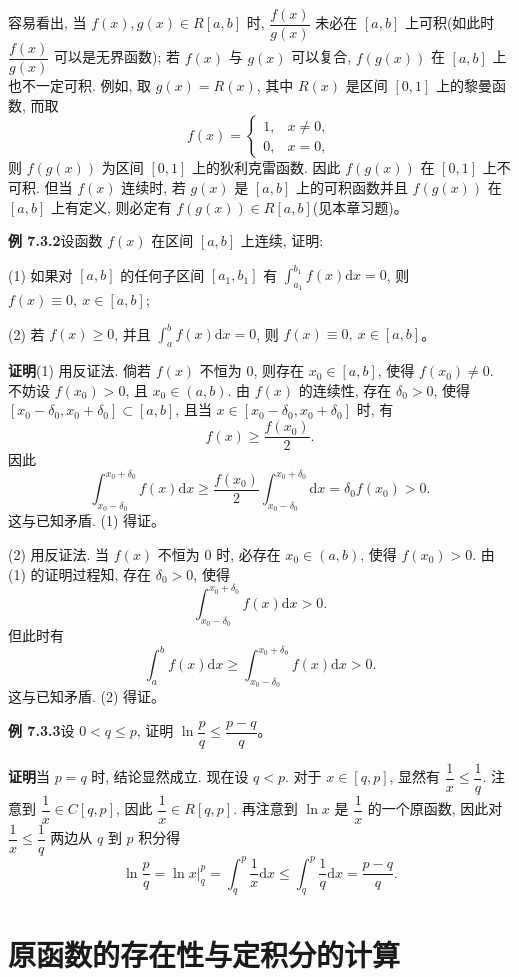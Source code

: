 \documentclass[UTF8,12pt,a4paper,fontset=fandol]{ctexart}
\begin{document}
容易看出, 当 $f(x),g(x)\in R[a,b]$ 时, $\dfrac{f(x)}{g(x)}$ 未必在 $[a,b]$ 上可积(如此时 $\dfrac{f(x)}{g(x)}$ 可以是无界函数); 若 $f(x)$ 与 $g(x)$ 可以复合, $f(g(x))$ 在 $[a,b]$ 上也不一定可积. 例如, 取 $g(x)=R(x)$, 其中 $R(x)$ 是区间 $[0,1]$ 上的黎曼函数, 而取
\[
  f(x)=
  \begin{cases}
    1, & x\neq0,\\
    0, & x=0,
  \end{cases}
\]
则 $f(g(x))$ 为区间 $[0,1]$ 上的狄利克雷函数. 因此 $f(g(x))$ 在 $[0,1]$ 上不可积. 但当 $f(x)$ 连续时, 若 $g(x)$ 是 $[a,b]$ 上的可积函数并且 $f(g(x))$ 在 $[a,b]$ 上有定义, 则必定有 $f(g(x))\in R[a,b]$(见本章习题)。

\noindent\textbf{例 7.3.2}\quad 设函数 $f(x)$ 在区间 $[a,b]$ 上连续, 证明:

(1) 如果对 $[a,b]$ 的任何子区间 $[a_1,b_1]$ 有 $\int_{a_1}^{b_1}f(x)\mathrm dx=0$, 则 $f(x)\equiv0,\ x\in[a,b]$;

(2) 若 $f(x)\geq0$, 并且 $\int_a^b f(x)\mathrm dx=0$, 则 $f(x)\equiv0,\ x\in[a,b]$。

\noindent\textbf{证明}\quad (1) 用反证法. 倘若 $f(x)$ 不恒为 $0$, 则存在 $x_0\in[a,b]$, 使得 $f(x_0)\neq0$. 不妨设 $f(x_0)>0$, 且 $x_0\in(a,b)$. 由 $f(x)$ 的连续性, 存在 $\delta_0>0$, 使得 $[x_0-\delta_0,x_0+\delta_0]\subset[a,b]$, 且当 $x\in[x_0-\delta_0,x_0+\delta_0]$ 时, 有
\[
  f(x)\geq\frac{f(x_0)}{2}.
\]
因此
\[
  \int_{x_0-\delta_0}^{x_0+\delta_0} f(x)\mathrm dx
  \geq \frac{f(x_0)}{2}\int_{x_0-\delta_0}^{x_0+\delta_0}\mathrm dx
  =\delta_0f(x_0)>0.
\]
这与已知矛盾. (1) 得证。

(2) 用反证法. 当 $f(x)$ 不恒为 $0$ 时, 必存在 $x_0\in(a,b)$, 使得 $f(x_0)>0$. 由 (1) 的证明过程知, 存在 $\delta_0>0$, 使得
\[
  \int_{x_0-\delta_0}^{x_0+\delta_0} f(x)\mathrm dx>0.
\]
但此时有
\[
  \int_a^b f(x)\mathrm dx\geq \int_{x_0-\delta_0}^{x_0+\delta_0} f(x)\mathrm dx>0.
\]
这与已知矛盾. (2) 得证。

\noindent\textbf{例 7.3.3}\quad 设 $0<q\leq p$, 证明 $\ln\dfrac{p}{q}\leq\dfrac{p-q}{q}$。

\noindent\textbf{证明}\quad 当 $p=q$ 时, 结论显然成立. 现在设 $q<p$. 对于 $x\in[q,p]$, 显然有 $\dfrac{1}{x}\leq\dfrac{1}{q}$. 注意到 $\dfrac{1}{x}\in C[q,p]$, 因此 $\dfrac{1}{x}\in R[q,p]$. 再注意到 $\ln x$ 是 $\dfrac{1}{x}$ 的一个原函数, 因此对 $\dfrac{1}{x}\leq\dfrac{1}{q}$ 两边从 $q$ 到 $p$ 积分得
\[
  \ln\frac{p}{q}=\ln x\bigg|_q^p=\int_q^p\frac{1}{x}\mathrm dx
  \leq \int_q^p\frac{1}{q}\mathrm dx=\frac{p-q}{q}.
\]

\section{原函数的存在性与定积分的计算}
\end{document}
